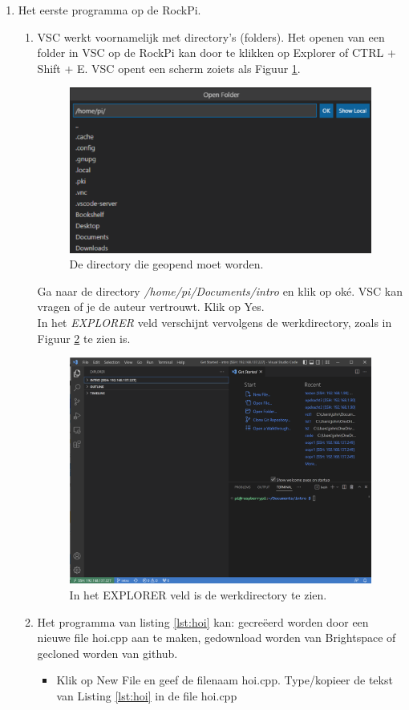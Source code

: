 \begin{enumerate}
\begin{enumerate}
\end{enumerate}  
	     \item Het eerste programma op de RockPi.
	     \begin{enumerate}
	     	\item VSC werkt voornamelijk met directory's (folders). Het openen van een folder in VSC op de RockPi kan door te klikken op Explorer  of CTRL + Shift + E. VSC opent een scherm zoiets als Figuur \ref{fig:vscOpenFolder}.
		    \begin{figure}[h!]
	\captionsetup{justification=centering}
	\includegraphics[width=0.6 \linewidth]{figuren/VSCopenFolder}
	\centering
	\caption{De directory die geopend moet worden.}
	\label{fig:vscOpenFolder}
\end{figure}
Ga naar de directory \textit{/home/pi/Documents/intro} en klik op oké.
VSC kan vragen of je de auteur vertrouwt. Klik op Yes. \\
 In het \textit{EXPLORER} veld verschijnt vervolgens de werkdirectory, zoals in Figuur \ref{fig:vscExploVeld} te zien is.
 	\begin{figure}[h!]
        	\captionsetup{justification=centering}
 	        \includegraphics[width=0.6 \linewidth]{figuren/VSCexplorerveld}
 	        \centering
 	        \caption{In het EXPLORER veld is de werkdirectory te zien.}
 	         \label{fig:vscExploVeld}
     \end{figure} 
\item Het programma van listing \ref{lst:hoi} kan:  gecreëerd worden door een nieuwe file hoi.cpp aan te maken, gedownload worden van Brightspace of gecloned worden van github.
\begin{itemize}
 \item Klik op New File   en geef de filenaam hoi.cpp.
	 Type/kopieer de tekst van Listing \ref{lst:hoi} in de file hoi.cpp
	 

\end{itemize}
\end{enumerate}
\end{enumerate}

